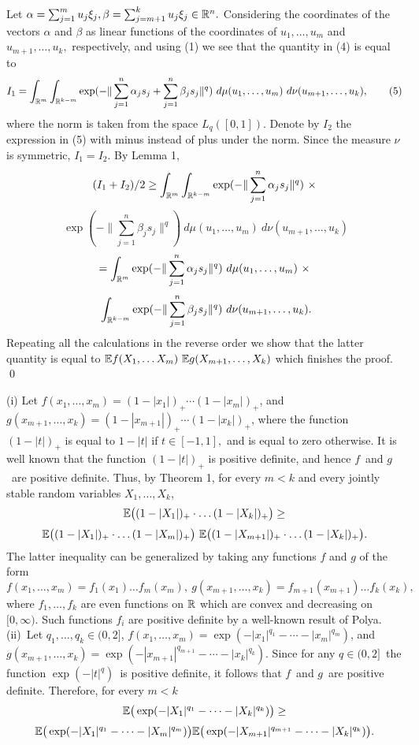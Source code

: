 Let $\alpha= \sum_{j=1}^m u_j\xi_j,\beta=\sum_{j=m+1}^k u_j\xi_j
\in \Bbb R^n.$ Considering the coordinates of the vectors 
$\alpha$ and $\beta$ as linear functions of the coordinates of
$u_1, \dots, u_m$ and 
$u_{m+1}, \dots, u_k,$ respectively, and using (1) we see that
the quantity in (4) is equal to
$$I_1=\int_{\Bbb R^m}\int_{\Bbb R^{k-m}} 
\exp(-\|\sum_{j=1}^n \alpha_j s_j + \sum_{j=1}^n \beta_j s_j\|^q) 
\ d\mu(u_1,\dots,u_m)\ d\nu(u_{m+1},\dots,u_k), \tag{5}$$ 
where the norm is taken from the space $L_q([0,1])$.
Denote by $I_2$ the expression in (5) with minus instead of 
plus under the norm.
Since the measure $\nu$ is symmetric, $I_1=I_2.$
By Lemma 1, 
$$(I_1+I_2)/2 \ge  \int_{\Bbb R^m}\int_{\Bbb R^{k-m}} 
\exp(-\|\sum_{j=1}^n \alpha_j s_j\|^q) \ \times$$
$$\ \exp(-\| \sum_{j=1}^n \beta_j s_j\|^q) 
\ d\mu(u_1,\dots,u_m)\ d\nu(u_{m+1},\dots,u_k) $$ 
$$ = \int_{\Bbb R^m}
\exp(-\|\sum_{j=1}^n \alpha_j s_j\|^q)\ d\mu(u_1,\dots,u_m)\ \times$$ 
$$\ \int_{\Bbb R^{k-m}}  \exp(-\| \sum_{j=1}^n \beta_j s_j\|^q) 
\ d\nu(u_{m+1},\dots,u_k).$$ 
Repeating all the calculations in the reverse order
we show that the latter quantity is equal to
$\Bbb E f(X_1,\dots X_m)  
\ \Bbb E g(X_{m+1},\dots, X_k)$
which finishes the proof. \qed \enddemo

\bigbreak

 (i) Let 
$f(x_1,\dots,x_m) = (1-|x_1|)_+ \cdots (1-|x_m|)_+$, and
$g(x_{m+1},\dots,x_k) = (1-|x_{m+1}|)_+ \cdots (1-|x_k|)_+$,
where the function $(1-|t|)_{+}$ is equal to $1-|t|$ if $t\in [-1,1],$
and is equal to zero otherwise. It is well known that the function
$(1-|t|)_{+}$ is positive definite, and hence $f$\ and $g$\ are
positive definite. Thus, by Theorem 1, for every $m<k$
and every jointly stable random variables $X_1,\dots,X_k$,
$$\Bbb E\big((1-|X_1|)_{+}\cdot \dots (1-|X_k|)_{+}\big) \ge$$
$$\Bbb E\big((1-|X_1|)_{+}\cdot \dots (1-|X_m|)_{+}\big)
\  \Bbb E\big((1-|X_{m+1}|)_{+}\cdot \dots (1-|X_k|)_{+}\big).$$
The latter inequality can be generalized by taking any functions 
$f$ and $g$ of the form  $f(x_1,\dots,x_m)=f_1(x_1)\dots f_m(x_m),
\ g(x_{m+1},\dots,x_k)=f_{m+1}(x_{m+1})\dots f_k(x_k),$ where
$f_1,\dots,f_k$ are even functions on $\Bbb R$ which are convex 
and decreasing on $[0,\infty).$ Such functions $f_i$ are positive
definite by a well-known result of Polya.
\medbreak
(ii)\ Let $q_1,\dots,q_k\in (0,2]$, 
$f(x_1,\dots,x_m) = \exp(-|x_1|^{q_1} - \cdots - |x_m|^{q_m})$, and
$g(x_{m+1},\dots,x_k) = \exp(-|x_{m+1}|^{q_{m+1}} - \cdots - |x_k|^{q_k})$.
Since for any $q \in (0,2]$\ the function $\exp(-|t|^q)$\ is positive
definite, it follows that $f$\ and $g$\ are positive definite.
Therefore, for every $m<k$
$$\Bbb E\big(\exp(-|X_1|^{q_1}-\dots-|X_k|^{q_k})\big) \ge$$
$$\Bbb E\big(\exp(-|X_1|^{q_1}-\dots-|X_m|^{q_m})\big)
\Bbb E\big(\exp(-|X_{m+1}|^{q_{m+1}}-\dots-|X_k|^{q_k})\big).$$

